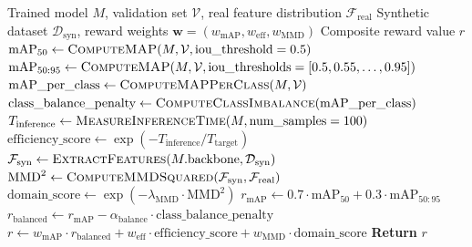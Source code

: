 \begin{algorithm}[H]
\caption{Composite Reward Function Computation}
\label{alg:reward_computation}
\begin{algorithmic}[1]
\Require Trained model $M$, validation set $\mathcal{V}$, real feature distribution $\mathcal{F}_{\text{real}}$
\Require Synthetic dataset $\mathcal{D}_{\text{syn}}$, reward weights $\mathbf{w} = (w_{\text{mAP}}, w_{\text{eff}}, w_{\text{MMD}})$
\Ensure Composite reward value $r$
\State {}
\State $\text{mAP}_{50} \gets \Call{ComputeMAP}{M, \mathcal{V}, \text{iou\_threshold}=0.5}$
\State $\text{mAP}_{50:95} \gets \Call{ComputeMAP}{M, \mathcal{V}, \text{iou\_thresholds}=[0.5, 0.55, \ldots, 0.95]}$
\State {}
\State $\text{mAP\_per\_class} \gets \Call{ComputeMAPPerClass}{M, \mathcal{V}}$
\State $\text{class\_balance\_penalty} \gets \Call{ComputeClassImbalance}{\text{mAP\_per\_class}}$
\State {}
\State $T_{\text{inference}} \gets \Call{MeasureInferenceTime}{M, \text{num\_samples}=100}$
\State $\text{efficiency\_score} \gets \exp(-T_{\text{inference}} / T_{\text{target}})$
\State {}
\State $\mathcal{F}_{\text{syn}} \gets \Call{ExtractFeatures}{M.\text{backbone}, \mathcal{D}_{\text{syn}}}$
\State $\text{MMD}^2 \gets \Call{ComputeMMDSquared}{\mathcal{F}_{\text{syn}}, \mathcal{F}_{\text{real}}}$
\State $\text{domain\_score} \gets \exp(-\lambda_{\text{MMD}} \cdot \text{MMD}^2)$
\State {}
\State $r_{\text{mAP}} \gets 0.7 \cdot \text{mAP}_{50} + 0.3 \cdot \text{mAP}_{50:95}$
\State $r_{\text{balanced}} \gets r_{\text{mAP}} - \alpha_{\text{balance}} \cdot \text{class\_balance\_penalty}$
\State $r \gets w_{\text{mAP}} \cdot r_{\text{balanced}} + w_{\text{eff}} \cdot \text{efficiency\_score} + w_{\text{MMD}} \cdot \text{domain\_score}$
\State \textbf{Return} $r$
\end{algorithmic}
\end{algorithm}

